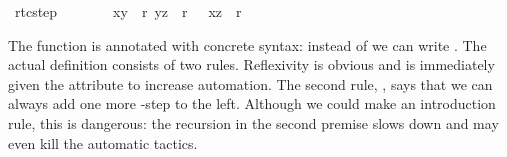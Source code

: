 \begin{isabellebody}
{}\ rtc{}step{}\ \ \ \ \ \ \ {}{}\ {}x{}y{}\ {}\ r{}\ {}y{}z{}\ {}\ r{}\ {}\ {}\ {}x{}z{}\ {}\ r{}{}%
\begin{isamarkuptext}%
\noindent
The function  is annotated with concrete syntax: instead of
 we can write . The actual definition
consists of two rules. Reflexivity is obvious and is immediately given the
 attribute to increase automation. The
second rule, , says that we can always add one more
-step to the left. Although we could make  an
introduction rule, this is dangerous: the recursion in the second premise
slows down and may even kill the automatic tactics.


\end{isamarkuptext}
\end{isabellebody}

